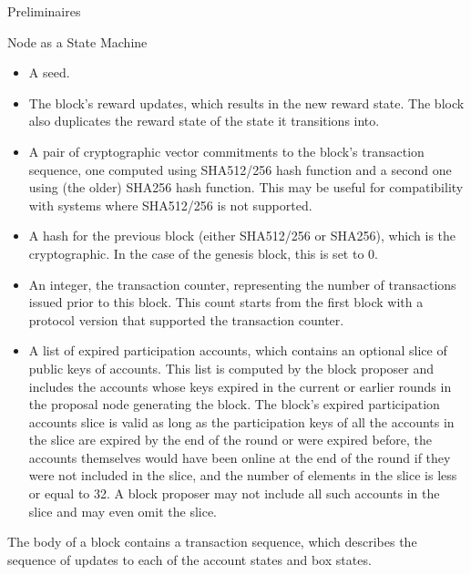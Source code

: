\documentclass[10pt,a4paper]{article}
\begin{document}
\begin{section}{Preliminaires}
\begin{subsection}{Node as a State Machine}
\begin{itemize}
    \item
    A seed.
    
    \item
    The block's reward updates, which results in the new reward state. The
    block also duplicates the reward state of the state it transitions into.
    
    \item
    A pair of cryptographic vector commitments to the block's transaction sequence,
    one computed using SHA512/256 hash function and a second one using (the older) 
    SHA256 hash function. This may be useful for compatibility with systems where SHA512/256 
    is not supported.
    
    \item
    A hash for the previous block (either SHA512/256 or SHA256), which is the cryptographic. 
    In the case of the genesis block, this is set to 0.
    
    \item
    An integer, the transaction counter, representing the number of transactions
    issued prior to this block. This count starts from the first block with a
    protocol version that supported the transaction counter.
    
    \item
    A list of expired participation accounts, which contains an optional slice
    of public keys of accounts. 
    This list is computed by the block proposer and includes the accounts whose 
    keys expired in the current or earlier rounds in the proposal node generating the block.
    The block's expired participation accounts slice is valid as long as the participation keys 
    of all the accounts in the slice are expired by the end of the round or
    were expired before, the accounts themselves would have been online at the end
    of the round if they were not included in the slice, and the number of elements
    in the slice is less or equal to 32. 
    A block proposer may not include all such accounts in the slice and may even omit
    the slice.
\end{itemize}

The body of a block contains a transaction sequence, which describes the sequence
of updates to each of the account states and box states. 
%


\end{subsection}
\end{section}
\end{document}

